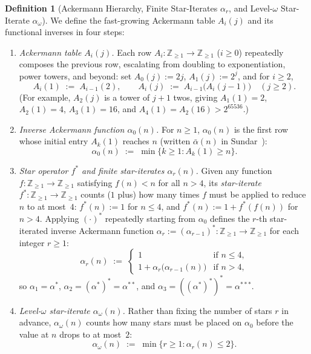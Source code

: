 \documentclass[11pt]{article}
\theoremstyle{definition}
\newtheorem{definition}[theorem]{Definition}
\theoremstyle{remark}
\begin{document}
\begin{definition}[Ackermann Hierarchy, Finite Star-Iterates $\alpha_r$, and Level-$\omega$ Star-Iterate $\alpha_\omega$]
\label{def:ackermann}
We define the fast-growing Ackermann table $A_i(j)$ and its functional inverses in four steps:
\begin{enumerate}[label=(\arabic*), leftmargin=2em, itemsep=2pt]
  \item \emph{Ackermann table $A_i(j)$.} Each row $A_i : \mathbb{Z}_{\ge 1} \to \mathbb{Z}_{\ge 1}$ ($i \ge 0$) repeatedly composes the previous row, escalating from doubling to exponentiation, power towers, and beyond: set $A_0(j) := 2j$, $A_1(j) := 2^j$, and for $i \ge 2$,
  \[
  A_i(1) \;:=\; A_{i-1}(2), \qquad A_i(j) \;:=\; A_{i-1}\big(A_i(j - 1)\big) \quad (j \ge 2).
  \]
  (For example, $A_2(j)$ is a tower of $j + 1$ twos, giving $A_1(1) = 2$, $A_2(1) = 4$, $A_3(1) = 16$, and $A_4(1) = A_2(16) > 2^{65536}$.)
  \item \emph{Inverse Ackermann function $\alpha_0(n)$.} For $n \ge 1$, $\alpha_0(n)$ is the first row whose initial entry $A_k(1)$ reaches $n$ (written $\bar{\alpha}(n)$ in Sundar~\cite{Sundar1992}):
  \[
  \alpha_0(n) \;:=\; \min\big\{k \ge 1 : A_k(1) \ge n\big\}.
  \]
  \item \emph{Star operator $f^*$ and finite star-iterates $\alpha_r(n)$.} Given any function $f : \mathbb{Z}_{\ge 1} \to \mathbb{Z}_{\ge 1}$ satisfying $f(n) < n$ for all $n > 4$, its \emph{star-iterate} $f^* : \mathbb{Z}_{\ge 1} \to \mathbb{Z}_{\ge 1}$ counts ($1$ plus) how many times $f$ must be applied to reduce $n$ to at most~$4$: $f^*(n) := 1$ for $n \le 4$, and $f^*(n) := 1 + f^*(f(n))$ for $n > 4$. Applying $(\cdot)^*$ repeatedly starting from $\alpha_0$ defines the $r$-th star-iterated inverse Ackermann function $\alpha_r := (\alpha_{r-1})^* : \mathbb{Z}_{\ge 1} \to \mathbb{Z}_{\ge 1}$ for each integer $r \ge 1$:
  \begin{equation}
  \label{eq:alpha-r}
  \alpha_r(n) \;:=\;
  \begin{cases}
  1 & \text{if } n \le 4,\\
  1 + \alpha_r\big(\alpha_{r-1}(n)\big) & \text{if } n > 4,
  \end{cases}
  \end{equation}
  so $\alpha_1 = \alpha^*$, $\alpha_2 = (\alpha^*)^* = \alpha^{**}$, and $\alpha_3 = ((\alpha^*)^*)^* = \alpha^{***}$.
  \item \emph{Level-$\omega$ star-iterate $\alpha_\omega(n)$.} Rather than fixing the number of stars $r$ in advance, $\alpha_\omega(n)$ counts how many stars must be placed on $\alpha_0$ before the value at $n$ drops to at most~$2$:
  \[
  \alpha_\omega(n) \;:=\; \min\big\{r \ge 1 : \alpha_r(n) \le 2\big\}.
  \]
\end{enumerate}
\end{definition}
\end{document}
